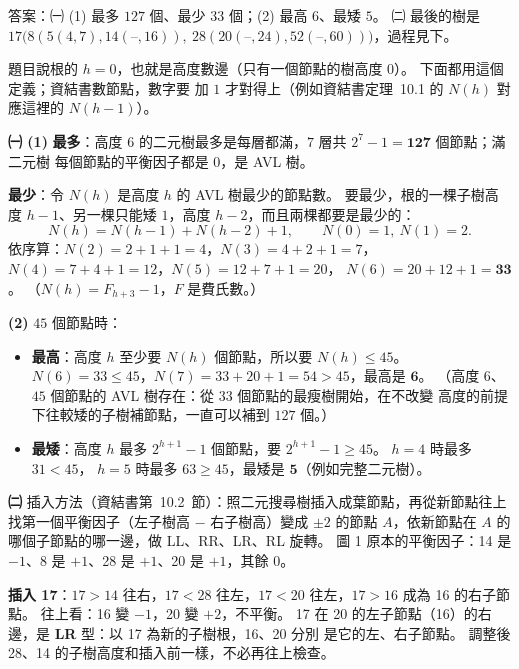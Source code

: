 \begin{pastsoln}
答案：㈠ (1) 最多 $127$ 個、最少 $33$ 個；(2) 最高 $6$、最矮 $5$。 ㈡ 最後的樹是
$17\bigl(8(5(4, 7), 14(\text{--}, 16)),\ 28(20(\text{--}, 24), 52(\text{--}, 60))\bigr)$，過程見下。

題目說根的 $h = 0$，也就是高度數邊（只有一個節點的樹高度 $0$）。 下面都用這個定義；資結書數節點，數字要
加 $1$ 才對得上（例如資結書定理~10.1 的 $N(h)$ 對應這裡的 $N(h - 1)$）。

\textbf{㈠ (1)} \textbf{最多}：高度 $6$ 的二元樹最多是每層都滿，$7$ 層共 $2^7 - 1 = \mathbf{127}$ 個節點；滿二元樹
每個節點的平衡因子都是 $0$，是 AVL 樹。

\textbf{最少}：令 $N(h)$ 是高度 $h$ 的 AVL 樹最少的節點數。 要最少，根的一棵子樹高度 $h - 1$、另一棵只能矮
$1$，高度 $h - 2$，而且兩棵都要是最少的：
\[
N(h) = N(h-1) + N(h-2) + 1,\qquad N(0) = 1,\ N(1) = 2.
\]
依序算：$N(2) = 2 + 1 + 1 = 4$，$N(3) = 4 + 2 + 1 = 7$，$N(4) = 7 + 4 + 1 = 12$，$N(5) = 12 + 7 + 1 = 20$，
$N(6) = 20 + 12 + 1 = \mathbf{33}$。 （$N(h) = F_{h+3} - 1$，$F$ 是費氏數。）

\textbf{(2)} $45$ 個節點時：
\begin{itemize}
\item \textbf{最高}：高度 $h$ 至少要 $N(h)$ 個節點，所以要 $N(h) \le 45$。 $N(6) = 33 \le 45$，$N(7) = 33 + 20 + 1
= 54 > 45$，最高是 $\mathbf{6}$。 （高度 $6$、$45$ 個節點的 AVL 樹存在：從 $33$ 個節點的最瘦樹開始，在不改變
高度的前提下往較矮的子樹補節點，一直可以補到 $127$ 個。）
\item \textbf{最矮}：高度 $h$ 最多 $2^{h+1} - 1$ 個節點，要 $2^{h+1} - 1 \ge 45$。 $h = 4$ 時最多 $31 < 45$，
$h = 5$ 時最多 $63 \ge 45$，最矮是 $\mathbf{5}$（例如完整二元樹）。
\end{itemize}

\textbf{㈡} 插入方法（資結書第~10.2~節）：照二元搜尋樹插入成葉節點，再從新節點往上找第一個平衡因子（左子樹高
$-$ 右子樹高）變成 $\pm 2$ 的節點 $A$，依新節點在 $A$ 的哪個子節點的哪一邊，做 LL、RR、LR、RL 旋轉。
圖 1 原本的平衡因子：14 是 $-1$、8 是 $+1$、28 是 $+1$、20 是 $+1$，其餘 $0$。

\textbf{插入 17}：$17 > 14$ 往右，$17 < 28$ 往左，$17 < 20$ 往左，$17 > 16$ 成為 16 的右子節點。 往上看：16 變
$-1$，20 變 $+2$，不平衡。 17 在 20 的左子節點（16）的右邊，是 \textbf{LR} 型：以 17 為新的子樹根，16、20 分別
是它的左、右子節點。 調整後 28、14 的子樹高度和插入前一樣，不必再往上檢查。


\end{pastsoln}
